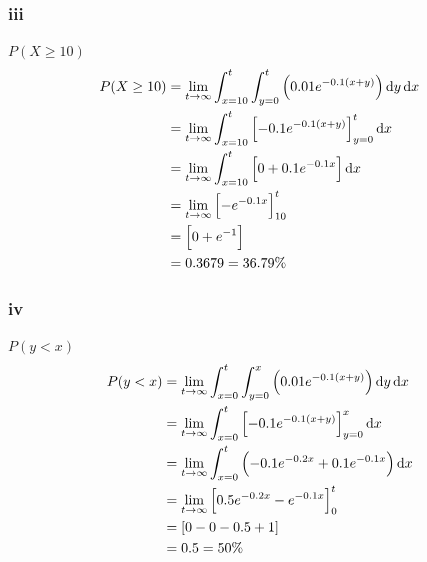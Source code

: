 \documentclass[11pt]{article}
\numberwithin{equation}{section}
\begin{document}
\subsubsection{iii}
$P(X \geq 10)$
\begin{align}
    P(X \geq 10) &= \lim_{t\rightarrow \infty} \int_{x=10}^{t} \int_{y=0}^{t} \left(0.01 e^{-0.1\left(x + y\right)}\right) \dif y \dif x\\
    &= \lim_{t\rightarrow \infty} \int_{x=10}^{t} \left[-0.1 e^{-0.1\left(x + y\right)}\right]_{y=0}^t \dif x\\
    &= \lim_{t\rightarrow \infty} \int_{x=10}^{t} \left[0+0.1 e^{-0.1x}\right] \dif x\\
    &= \lim_{t\rightarrow \infty} \left[- e^{-0.1x}\right]_{10}^t\\
    &= \left[0 + e^{-1}\right]\\
    &= 0.3679 = 36.79\%
\end{align}
\subsubsection{iv}
$P(y < x)$
\begin{align}
    P(y < x) &= \lim_{t\rightarrow \infty} \int_{x=0}^{t} \int_{y=0}^{x} \left(0.01 e^{-0.1\left(x + y\right)}\right) \dif y \dif x\\
    &= \lim_{t\rightarrow \infty} \int_{x=0}^{t} \left[-0.1 e^{-0.1\left(x + y\right)}\right]_{y=0}^x \dif x\\
    &= \lim_{t\rightarrow \infty} \int_{x=0}^{t} \left(-0.1e^{-0.2x}+0.1 e^{-0.1x}\right) \dif x\\
    &= \lim_{t\rightarrow \infty} \left[0.5 e^{-0.2x}- e^{-0.1x}\right]_{0}^t\\
    &= \left[0 - 0 - 0.5 + 1\right]\\
    &= 0.5 = 50\%
\end{align}
\end{document}
